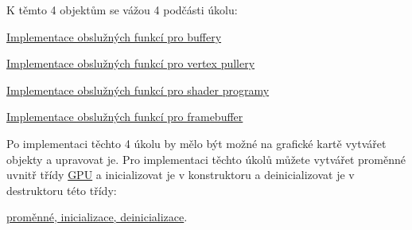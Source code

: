 K těmto 4 objektům se vážou 4 podčásti úkolu\+: 
\begin{DoxyItemize}
\item \hyperlink{group__buffer__tasks}{Implementace obslužných funkcí pro buffery} 
\item \hyperlink{group__vertexpuller__tasks}{Implementace obslužných funkcí pro vertex pullery} 
\item \hyperlink{group__program__tasks}{Implementace obslužných funkcí pro shader programy} 
\item \hyperlink{group__framebuffer__tasks}{Implementace obslužných funkcí pro framebuffer} 
\end{DoxyItemize}

Po implementaci těchto 4 úkolu by mělo být možné na grafické kartě vytvářet objekty a upravovat je. Pro implementaci těchto úkolů můžete vytvářet proměnné uvnitř třídy \hyperlink{classGPU}{G\+PU} a inicializovat je v konstruktoru a deinicializovat je v destruktoru této třídy\+: 
\begin{DoxyItemize}
\item \hyperlink{group__gpu__init}{proměnné, inicializace, deinicializace}. 
\end{DoxyItemize}

